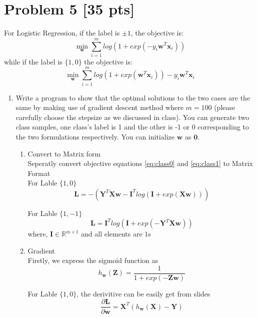 \documentclass[11pt]{article}
\newcommand{\mtx}[1]{\mathbf{#1}}
\newcommand{\vct}[1]{\mathbf{#1}}
\def \mI {\mtx{I}}
\def \mL {\mtx{L}}
\def \mX {\mtx{X}}
\def \mY {\mtx{Y}}
\def \mZ {\mtx{Z}}
\def \vzero    {\vct{0}}
\def \vw {\vct{w}}
\def \vx {\vct{x}}
\begin{document}
\section*{Problem 5 [35 pts]}
For Logistic Regression, if the label is $\pm1$, the objective is:
\begin{equation}\label{eq:class1}
\min_\vw	\sum_{i=1}^{m}log(1+exp(-y_i\vw^T\vx_i))
\end{equation}
while if the label is $\{1,0\}$ the objective is:
\begin{equation}\label{eq:class0}
	\min_\vw	\sum_{i=1}^{m}log(1+exp(\vw^T\vx_i))-y_i\vw^T\vx_i
\end{equation}
\begin{enumerate}
	\item Write a program to show that the optimal solutions to the two cases  are the same by making use of gradient descent method where $m=100$ (please carefully choose the stepsize as we discussed in class). You can generate two class samples, one class's label is 1 and the other is -1 or 0 corresponding to the two formulations respectively. You can initialize $\vw$ as $\vzero$.
	\begin{enumerate}
		
		\item Convert to Matrix form \\
		Seperatly convert objective equations \ref{eq:class0} and  \ref{eq:class1} to Matrix Format
		\\
		For Lable $\{1,0\}$
		\begin{equation}
			\mL =  -(\mY^T\mX\vw - \mI^Tlog(\mI+exp(\mX\vw)))
		\end{equation}

		For Lable $\{1,-1\}$
		\begin{equation}
			 \mL = \mI^Tlog(\mI+exp(-\mY^T\mX\vw ))
		\end{equation}
		where, 
		$\mI \in \mathbb{R}^{m\times 1}$ and all elements are $1$s
		\item Gradient\\
		Firstly, we express the sigmoid function as 
		\begin{equation}
			h_{\vw}(\mZ) = \frac{1}{1+exp(-\mZ\vw)}
		\end{equation}

		For Lable $\{1,0\}$, the derivitive can be easily get from slides
		\begin{equation}
			\frac{\partial \mL}{\partial \vw} = \mX^T(h_{\vw}(\mX)-\mY)
		\end{equation}


\end{enumerate}
\end{enumerate}
\end{document}
